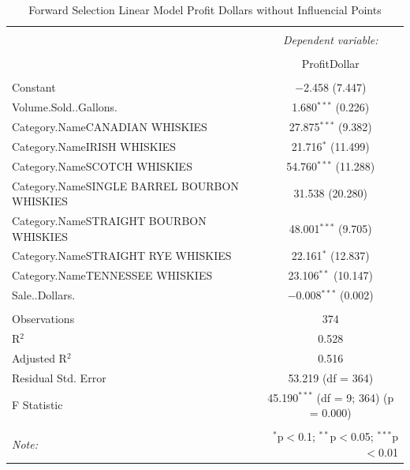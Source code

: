 \documentclass[]{elsarticle} %
\begin{document}
\begin{table}[!htbp] \centering 
  \caption{Forward Selection Linear Model Profit Dollars without Influencial Points} 
  \label{} 
\normalsize 
\begin{tabular}{@{\extracolsep{5pt}}lc} 
\\[-1.8ex]\hline 
\hline \\[-1.8ex] 
 & \multicolumn{1}{c}{\textit{Dependent variable:}} \\ 
\cline{2-2} 
\\[-1.8ex] & ProfitDollar \\ 
\hline \\[-1.8ex] 
 Constant & $-$2.458 (7.447) \\ 
  Volume.Sold..Gallons. & 1.680$^{***}$ (0.226) \\ 
  Category.NameCANADIAN WHISKIES & 27.875$^{***}$ (9.382) \\ 
  Category.NameIRISH WHISKIES & 21.716$^{*}$ (11.499) \\ 
  Category.NameSCOTCH WHISKIES & 54.760$^{***}$ (11.288) \\ 
  Category.NameSINGLE BARREL BOURBON WHISKIES & 31.538 (20.280) \\ 
  Category.NameSTRAIGHT BOURBON WHISKIES & 48.001$^{***}$ (9.705) \\ 
  Category.NameSTRAIGHT RYE WHISKIES & 22.161$^{*}$ (12.837) \\ 
  Category.NameTENNESSEE WHISKIES & 23.106$^{**}$ (10.147) \\ 
  Sale..Dollars. & $-$0.008$^{***}$ (0.002) \\ 
 \hline \\[-1.8ex] 
Observations & 374 \\ 
R$^{2}$ & 0.528 \\ 
Adjusted R$^{2}$ & 0.516 \\ 
Residual Std. Error & 53.219 (df = 364) \\ 
F Statistic & 45.190$^{***}$ (df = 9; 364)  (p = 0.000) \\ 
\hline 
\hline \\[-1.8ex] 
\textit{Note:}  & \multicolumn{1}{r}{$^{*}$p$<$0.1; $^{**}$p$<$0.05; $^{***}$p$<$0.01} \\ 
\end{tabular} 
\end{table}
\end{document}
